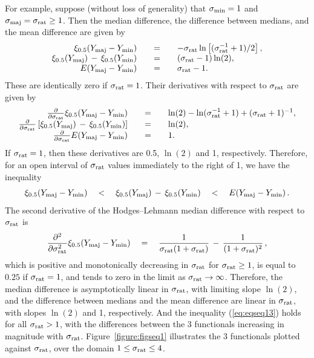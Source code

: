 \documentclass[a4paper]{article}      %
\begin{document}
\def\sigmarat{\sigma_{\rm rat}}
For example, suppose (without loss of generality) that $\sigma_{\rm min}=1$ and $\sigmamaj=\sigmarat\ge 1$.
Then the median difference, the difference between medians, and the mean difference are given by
\begin{equation}
\begin{array}{rcl}
\xi_{0.5}(\Ymaj-\Ymin) &\quad = \quad& -\sigmarat \ln \left[ {(\sigmarat^{-1} + 1) / 2 } \right], \\
\xi_{0.5}(\Ymaj) \, - \, \xi_{0.5}(\Ymin) &\quad = \quad& (\sigmarat-1) \ln(2) , \\
E(\Ymaj-\Ymin) &\quad = \quad& \sigmarat-1.
\end{array}
\label{eq:eqseq11}
\end{equation}
These are identically zero if $\sigmarat=1$. Their derivatives with respect to $\sigmarat$ are given by
\begin{equation}
\begin{array}{rcl}
{\partial\over{\partial \sigmarat}} \xi_{0.5}(\Ymaj-\Ymin) &\quad = \quad& \ln(2) - \ln (\sigmarat^{-1}+1) + (\sigmarat+1)^{-1} , \\
{\partial\over{\partial \sigmarat}} \left[ \xi_{0.5}(\Ymaj) \, - \, \xi_{0.5}(\Ymin) \right] &\quad = \quad& \ln(2) , \\
{\partial\over{\partial \sigmarat}} E(\Ymaj-\Ymin) &\quad = \quad& 1.
\end{array}
\label{eq:eqseq12}
\end{equation}
If $\sigmarat=1$, then these derivatives are 0.5, $\ln(2)$ and 1, respectively.
Therefore, for an open interval of $\sigmarat$ values immediately to the right of 1, we have the inequality
\begin{equation}
\xi_{0.5}(Y_{\rm maj}-Y_{\rm min}) \quad < \quad \xi_{0.5}(Y_{\rm maj}) \, - \, \xi_{0.5}(Y_{\rm min}) \quad < \quad E(Y_{\rm maj}-Y_{\rm min}) \, .
\label{eq:eqseq13}
\end{equation}
The second derivative of the Hodges--Lehmann median difference with respect to $\sigmarat$ is
\begin{equation}
{{\partial^2}\over{\partial \sigmarat^2}} \xi_{0.5}(\Ymaj-\Ymin) \quad = \quad {1\over{\sigmarat(1+\sigmarat)}} \, - \, {1\over{(1+\sigmarat)^2}} \, ,
\label{eq:eqseq14}
\end{equation}
which is positive and monotonically decreasing in $\sigmarat$ for $\sigmarat \ge 1$, is equal to $0.25$ if $\sigmarat=1$,
and tends to zero in the limit as $\sigmarat\rightarrow\infty$.
Therefore,
the median difference is asymptotically linear in $\sigmarat$,
with limiting slope $\ln(2)$,
and the difference between medians and the mean difference are linear in $\sigmarat$,
with slopes $\ln(2)$ and 1, respectively.
And the inequality (\ref{eq:eqseq13}) holds for all $\sigmarat>1$,
with the differences between the 3 functionals increasing in magnitude with $\sigmarat$.
Figure~\ref{figure:figseq1} illustrates the 3 functionals plotted against $\sigmarat$,
over the domain $1 \le \sigmarat \le 4$.
\end{document}
